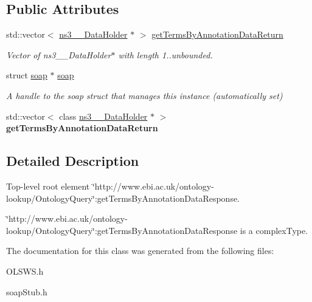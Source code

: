 \subsection*{Public Attributes}
\begin{DoxyCompactItemize}
\item 
\hypertarget{class__ns1____getTermsByAnnotationDataResponse_a10e01f882977df9df9f84172c7027b7a}{
std::vector$<$ \hyperlink{classns3____DataHolder}{ns3\_\-\_\-DataHolder} $\ast$ $>$ \hyperlink{class__ns1____getTermsByAnnotationDataResponse_a10e01f882977df9df9f84172c7027b7a}{getTermsByAnnotationDataReturn}}
\label{class__ns1____getTermsByAnnotationDataResponse_a10e01f882977df9df9f84172c7027b7a}

\begin{DoxyCompactList}\small\item\em Vector of ns3\_\-\_\-DataHolder$\ast$ with length 1..unbounded. \end{DoxyCompactList}\item 
\hypertarget{class__ns1____getTermsByAnnotationDataResponse_acd6477b3176f1405d96fc4d02fcafe70}{
struct \hyperlink{class__ns1____getTermsByAnnotationDataResponse_acd6477b3176f1405d96fc4d02fcafe70}{soap} $\ast$ \hyperlink{class__ns1____getTermsByAnnotationDataResponse_acd6477b3176f1405d96fc4d02fcafe70}{soap}}
\label{class__ns1____getTermsByAnnotationDataResponse_acd6477b3176f1405d96fc4d02fcafe70}

\begin{DoxyCompactList}\small\item\em A handle to the soap struct that manages this instance (automatically set) \end{DoxyCompactList}\item 
\hypertarget{class__ns1____getTermsByAnnotationDataResponse_af6531b915381ce6c55a4ef14b7eb77a4}{
std::vector$<$ class \hyperlink{classns3____DataHolder}{ns3\_\-\_\-DataHolder} $\ast$ $>$ {\bfseries getTermsByAnnotationDataReturn}}
\label{class__ns1____getTermsByAnnotationDataResponse_af6531b915381ce6c55a4ef14b7eb77a4}

\end{DoxyCompactItemize}


\subsection{Detailed Description}
Top-\/level root element \char`\"{}http://www.ebi.ac.uk/ontology-\/lookup/OntologyQuery\char`\"{}:getTermsByAnnotationDataResponse. 

\char`\"{}http://www.ebi.ac.uk/ontology-\/lookup/OntologyQuery\char`\"{}:getTermsByAnnotationDataResponse is a complexType. 

The documentation for this class was generated from the following files:\begin{DoxyCompactItemize}
\item 
OLSWS.h\item 
soapStub.h\end{DoxyCompactItemize}
